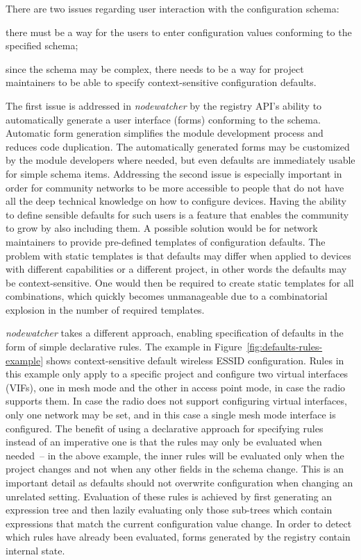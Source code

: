 \documentclass[5p,sort&compress]{elsarticle}
\newcommand{\nodewatcher}{\textit{nodewatcher}}
\begin{document}
There are two issues regarding user interaction with the configuration schema:
\begin{enumerate*}[label=\itshape\alph*\upshape)]
\item there must be a way for the users to enter configuration values conforming to the specified schema;
\item since the schema may be complex, there needs to be a way for project maintainers to be able to specify context-sensitive configuration defaults.
\end{enumerate*}
The first issue is addressed in \nodewatcher{} by the registry API's ability to automatically generate a user interface (forms) conforming to the schema.
Automatic form generation simplifies the module development process and reduces code duplication.
The automatically generated forms may be customized by the module developers where needed, but even defaults are immediately usable for simple schema items.
Addressing the second issue is especially important in order for community networks to be more accessible to people that do not have all the deep technical knowledge on how to configure devices.
Having the ability to define sensible defaults for such users is a feature that enables the community to grow by also including them.
A possible solution would be for network maintainers to provide pre-defined templates of configuration defaults.
The problem with static templates is that defaults may differ when applied to devices with different capabilities or a different project, in other words the defaults may be context-sensitive.
One would then be required to create static templates for all combinations, which quickly becomes unmanageable due to a combinatorial explosion in the number of required templates.

\nodewatcher{} takes a different approach, enabling specification of defaults in the form of simple declarative rules.
The example in Figure~\ref{fig:defaults-rules-example} shows context-sensitive default wireless ESSID configuration.
Rules in this example only apply to a specific project and configure two virtual interfaces (VIFs), one in mesh mode and the other in access point mode, in case the radio supports them.
In case the radio does not support configuring virtual interfaces, only one network may be set, and in this case a single mesh mode interface is configured.
The benefit of using a declarative approach for specifying rules instead of an imperative one is that the rules may only be evaluated when needed~-- in the above example, the inner rules will be evaluated only when the project changes and not when any other fields in the schema change.
This is an important detail as defaults should not overwrite configuration when changing an unrelated setting.
Evaluation of these rules is achieved by first generating an expression tree and then lazily evaluating only those sub-trees which contain expressions that match the current configuration value change.
In order to detect which rules have already been evaluated, forms generated by the registry contain internal state.
\end{document}
